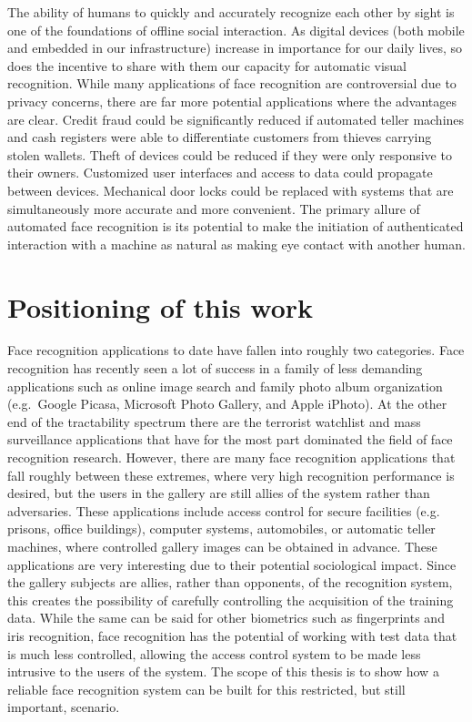 The ability of humans to quickly and accurately recognize each other by sight
is one of the foundations of offline social interaction.  As digital devices
(both mobile and embedded in our infrastructure) increase in importance for our
daily lives, so does the incentive to share with them our capacity for
automatic visual recognition.  While many applications of face recognition are
controversial due to privacy concerns, there are far more potential
applications where the advantages are clear.  Credit fraud could be
significantly reduced if automated teller machines and cash registers were able
to differentiate customers from thieves carrying stolen wallets.  Theft of
devices could be reduced if they were only responsive to their owners.
Customized user interfaces and access to data could propagate between devices.
Mechanical door locks could be replaced with systems that are simultaneously
more accurate and more convenient.  The primary allure of
automated face recognition is its potential to make the initiation of
authenticated interaction with a machine as natural as making eye contact with
another human.

\section{Positioning of this work} Face recognition applications to date have
fallen into roughly two categories.  Face recognition has recently seen a lot
of success in a family of less demanding applications such as online image
search and family photo album organization (e.g.\ Google Picasa, Microsoft
Photo Gallery, and Apple iPhoto). At the other end of the tractability spectrum
there are the terrorist watchlist and mass surveillance applications that have
for the most part dominated the field of face recognition research.  However,
there are many face recognition applications that fall roughly between these
extremes, where very high recognition performance is desired, but the users in
the gallery are still allies of the system rather than adversaries.  These
applications include access control for secure facilities (e.g. prisons,
office buildings), computer systems, automobiles, or automatic teller machines,
where controlled gallery images can be obtained in advance.  These applications
are very interesting due to their potential sociological impact.  Since the
gallery subjects are allies, rather than opponents, of the recognition system,
this creates the possibility of carefully controlling the acquisition of the
training data. While the same can be said for other biometrics such as
fingerprints and iris recognition, face recognition has the potential of
working with test data that is much less controlled, allowing the access
control system to be made less intrusive to the users of the system.  The scope
of this thesis is to show how a reliable face recognition system can be built
for this restricted, but still important, scenario.  


